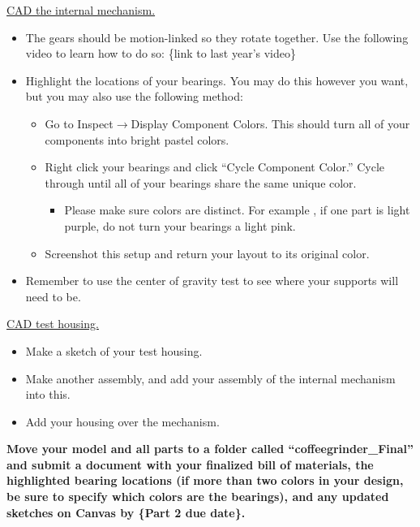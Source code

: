 \documentclass[11pt,letterpaper]{article}
\begin{document}
\begin{AssignmentSteps}
  \item \underline{CAD the internal mechanism.}
  \begin{itemize}
    \item The gears should be motion-linked so they rotate together. Use the following video to learn how to do so: \{link to last year's video\}
    \item Highlight the locations of your bearings. You may do this however you want, but you may also use the following method:
    \begin{itemize}
      \item Go to Inspect\(\rightarrow\)Display Component Colors. This should turn all of your components into bright pastel colors.
      \item Right click your bearings and click ``Cycle Component Color.'' Cycle through until all of your bearings share the same unique color.
      \begin{itemize}
        \item Please make sure colors are distinct. For example , if one part is light purple, do not turn your bearings a light pink.
      \end{itemize}
      \item Screenshot this setup and return your layout to its original color.
    \end{itemize}
    \item Remember to use the center of gravity test to see where your supports will need to be.
  \end{itemize}

  \item \underline{CAD test housing.}
  \begin{itemize}
    \item Make a sketch of your test housing.
    \item Make another assembly, and add your assembly of the internal mechanism into this.
    \item Add your housing over the mechanism.
  \end{itemize}
\end{AssignmentSteps}

\newpage

\textbf{Move your model and all parts to a folder called ``coffeegrinder\_Final'' and submit a document with your finalized bill of materials, the highlighted bearing locations (if more than two colors in your design, be sure to specify which colors are the bearings), and any updated sketches on Canvas by \{Part 2 due date\}.}
\end{document}
